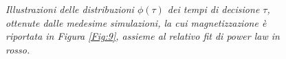 \documentclass{article}
\begin{document}
\begin{figure}[h]
{\centering\par
{}
\par}
{\centering\par
{}
\par}
\caption{\textit{Illustrazioni delle distribuzioni $\phi(\tau)$ dei tempi di decisione $\tau$, ottenute dalle medesime simulazioni, la cui magnetizzazione è riportata in Figura \ref{Fig:9}, assieme al relativo fit di power law in rosso.  }}
\label{Fig:10}
\end{figure}
\end{document}
